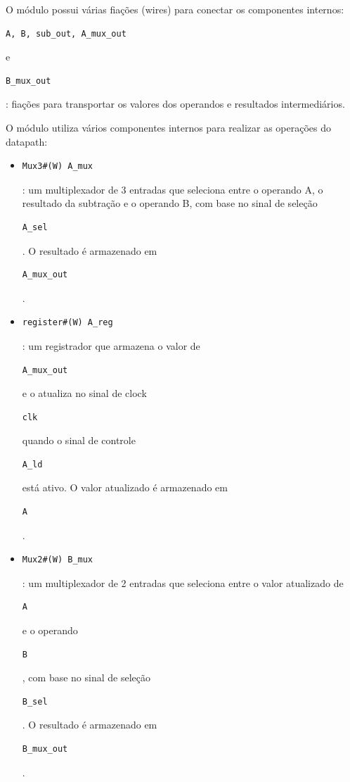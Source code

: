 \documentclass[a4paper,11pt]{article} %
\begin{document}
O módulo possui várias fiações (wires) para conectar os componentes internos:

\begin{verbatim}A, B, sub_out, A_mux_out\end{verbatim} e \begin{verbatim}B_mux_out\end{verbatim}: fiações para transportar os valores dos operandos e resultados intermediários.

O módulo utiliza vários componentes internos para realizar as operações do datapath:

\begin{itemize}
    \item \begin{verbatim}Mux3#(W) A_mux\end{verbatim}: um multiplexador de 3 entradas que seleciona entre o operando A, o resultado da subtração e o operando B, com base no sinal de seleção \begin{verbatim}A_sel\end{verbatim}. O resultado é armazenado em \begin{verbatim}A_mux_out\end{verbatim}.
    \item \begin{verbatim}register#(W) A_reg\end{verbatim}: um registrador que armazena o valor de \begin{verbatim}A_mux_out\end{verbatim} e o atualiza no sinal de clock \begin{verbatim}clk\end{verbatim} quando o sinal de controle \begin{verbatim}A_ld\end{verbatim} está ativo. O valor atualizado é armazenado em \begin{verbatim}A\end{verbatim}.
    \item \begin{verbatim}Mux2#(W) B_mux\end{verbatim}: um multiplexador de 2 entradas que seleciona entre o valor atualizado de \begin{verbatim}A\end{verbatim} e o operando \begin{verbatim}B\end{verbatim}, com base no sinal de seleção \begin{verbatim}B_sel\end{verbatim}. O resultado é armazenado em \begin{verbatim}B_mux_out\end{verbatim}.

\end{itemize}
\end{document}
